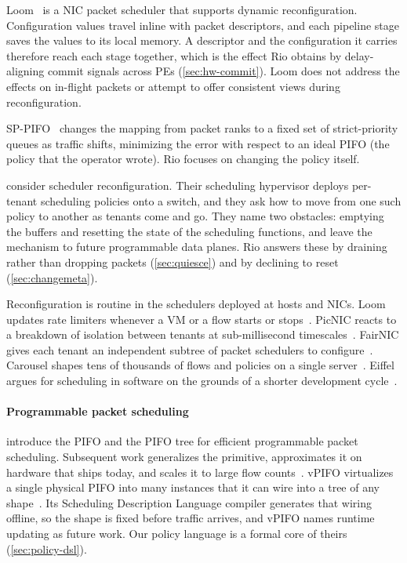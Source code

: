 \documentclass[sigplan,anonymous,review,nonacm]{acmart}
\begin{document}
Loom~\cite{Stephens19} is a NIC packet scheduler that supports dynamic reconfiguration.
Configuration values travel inline with packet descriptors, and each pipeline stage saves the values to its local memory.
A descriptor and the configuration it carries therefore reach each stage together, which is the effect Rio obtains by delay-aligning commit signals across PEs (\cref{sec:hw-commit}).
Loom does not address the effects on in-flight packets or attempt to offer consistent views during reconfiguration.

SP-PIFO~\cite{Alcoz20} changes the mapping from packet ranks to a fixed set of strict-priority queues as traffic shifts, minimizing the error with respect to an ideal PIFO (the policy that the operator wrote).
Rio focuses on changing the policy itself.

\citet{Alcoz23} consider scheduler reconfiguration.
Their scheduling hypervisor deploys per-tenant scheduling policies onto a switch, and they ask how to move from one such policy to another as tenants come and go.
They name two obstacles: emptying the buffers and resetting the state of the scheduling functions, and leave the mechanism to future programmable data planes.
Rio answers these by draining rather than dropping packets (\cref{sec:quiesce}) and by declining to reset (\cref{sec:changemeta}).

Reconfiguration is routine in the schedulers deployed at hosts and NICs.
Loom updates rate limiters whenever a VM or a flow starts or stops~\cite{Stephens19}.
PicNIC reacts to a breakdown of isolation between tenants at sub-millisecond timescales~\cite{Kumar19}.
FairNIC gives each tenant an independent subtree of packet schedulers to configure~\cite{Grant20}.
Carousel shapes tens of thousands of flows and policies on a single server~\cite{Saeed17}.
Eiffel argues for scheduling in software on the grounds of a shorter development cycle~\cite{Saeed19}.

\paragraph{Programmable packet scheduling}

\citet{Sivaraman16} introduce the PIFO and the PIFO tree for efficient programmable packet scheduling.
Subsequent work generalizes the primitive, approximates it on hardware that ships today, and scales it to large flow counts~\cite{Shrivastav19,Alcoz20,Alcoz25,Mostafaei25,Yao23,Atre24,Gao22}.
vPIFO virtualizes a single physical PIFO into many instances that it can wire into a tree of any shape~\cite{vPIFO}.
Its Scheduling Description Language compiler generates that wiring offline, so the shape is fixed before traffic arrives, and vPIFO names runtime updating as future work.
Our policy language is a formal core of theirs (\cref{sec:policy-dsl}).
\end{document}
